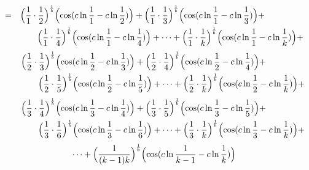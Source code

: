 \documentclass{amsart}
\begin{document}
	\[
	\begin{aligned}
		= \quad & \Bigl( \frac{1}{1} \cdot \frac{1}{2} \Bigr)^\frac1b \Bigl( \cos(c \ln \frac{1}{1} - c \ln \frac{1}{2}) \Bigr) + \Bigl( \frac{1}{1} \cdot \frac{1}{3} \Bigr)^\frac1b \Bigl( \cos(c \ln \frac{1}{1} - c \ln \frac{1}{3}) \Bigr) + \\
		& \qquad \Bigl( \frac{1}{1} \cdot \frac{1}{4} \Bigr)^\frac1b \Bigl( \cos(c \ln \frac{1}{1} - c \ln \frac{1}{4}) \Bigr) + \dots  + \Bigl( \frac{1}{1} \cdot \frac{1}{k} \Bigr)^\frac1b \Bigl( \cos(c \ln \frac{1}{1} - c \ln \frac{1}{k}) \Bigr) + 
	\end{aligned}
	\]
	\[
	\begin{aligned}
		\quad\quad & \Bigl( \frac{1}{2} \cdot \frac{1}{3} \Bigr)^\frac1b \Bigl( \cos(c \ln \frac{1}{2} - c \ln \frac{1}{3}) \Bigr) + \Bigl( \frac{1}{2} \cdot \frac{1}{4} \Bigr)^\frac1b \Bigl( \cos(c \ln \frac{1}{2} - c \ln \frac{1}{4}) \Bigr) + \\
		& \qquad \Bigl( \frac{1}{2} \cdot \frac{1}{5} \Bigr)^\frac1b \Bigl( \cos(c \ln \frac{1}{2} - c \ln\frac{1}{5}) \Bigr) + \dots  + \Bigl( \frac{1}{2} \cdot \frac{1}{k} \Bigr)^\frac1b \Bigl( \cos(c \ln \frac{1}{2} - c \ln \frac{1}{k}) \Bigr) + 
	\end{aligned}
	\]
	\[
	\begin{aligned}
		\quad\quad & \Bigl( \frac{1}{3} \cdot \frac{1}{4} \Bigr)^\frac1b \Bigl( \cos(c \ln \frac{1}{3} - c \ln \frac{1}{4}) \Bigr) + \Bigl( \frac{1}{3} \cdot \frac{1}{5} \Bigr)^\frac1b \Bigl( \cos(c \ln \frac{1}{3} - c \ln \frac{1}{5}) \Bigr) + \\
		& \qquad \Bigl( \frac{1}{3} \cdot \frac{1}{6} \Bigr)^\frac1b \Bigl( \cos(c \ln \frac{1}{3} - c \ln \frac{1}{6}) \Bigr) + \dots  + \Bigl( \frac{1}{3} \cdot \frac{1}{k} \Bigr)^\frac1b \Bigl( \cos(c \ln \frac{1}{3} - c \ln \frac{1}{k}) \Bigr) + 
	\end{aligned}
	\]
	\[ \dots + \Bigl( \frac{1}{(k-1)k} \Bigr)^\frac1b \Bigl( \cos(c \ln \frac{1}{k-1} - c \ln \frac{1}{k}) \Bigr) \]
	
\end{document}
